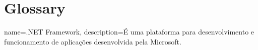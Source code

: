 \chapter*{Glossary}
\makeglossaries

{
  name={.NET Framework},
  description={É uma plataforma para desenvolvimento e funcionamento de aplicações desenvolvida pela Microsoft.}
}
